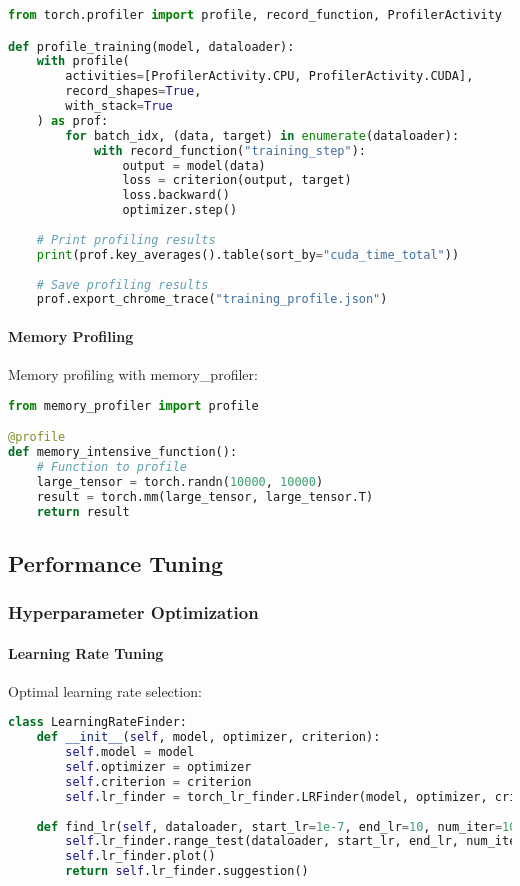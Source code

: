 \begin{lstlisting}[language=python, caption=PyTorch Profiler]
from torch.profiler import profile, record_function, ProfilerActivity

def profile_training(model, dataloader):
    with profile(
        activities=[ProfilerActivity.CPU, ProfilerActivity.CUDA],
        record_shapes=True,
        with_stack=True
    ) as prof:
        for batch_idx, (data, target) in enumerate(dataloader):
            with record_function("training_step"):
                output = model(data)
                loss = criterion(output, target)
                loss.backward()
                optimizer.step()
    
    # Print profiling results
    print(prof.key_averages().table(sort_by="cuda_time_total"))
    
    # Save profiling results
    prof.export_chrome_trace("training_profile.json")
\end{lstlisting}

\paragraph{Memory Profiling}
Memory profiling with memory\_profiler:

\begin{lstlisting}[language=python, caption=Memory Profiling]
from memory_profiler import profile

@profile
def memory_intensive_function():
    # Function to profile
    large_tensor = torch.randn(10000, 10000)
    result = torch.mm(large_tensor, large_tensor.T)
    return result
\end{lstlisting}

\subsection{Performance Tuning}

\subsubsection{Hyperparameter Optimization}

\paragraph{Learning Rate Tuning}
Optimal learning rate selection:

\begin{lstlisting}[language=python, caption=Learning Rate Finder]
class LearningRateFinder:
    def __init__(self, model, optimizer, criterion):
        self.model = model
        self.optimizer = optimizer
        self.criterion = criterion
        self.lr_finder = torch_lr_finder.LRFinder(model, optimizer, criterion)
    
    def find_lr(self, dataloader, start_lr=1e-7, end_lr=10, num_iter=100):
        self.lr_finder.range_test(dataloader, start_lr, end_lr, num_iter)
        self.lr_finder.plot()
        return self.lr_finder.suggestion()
\end{lstlisting}

